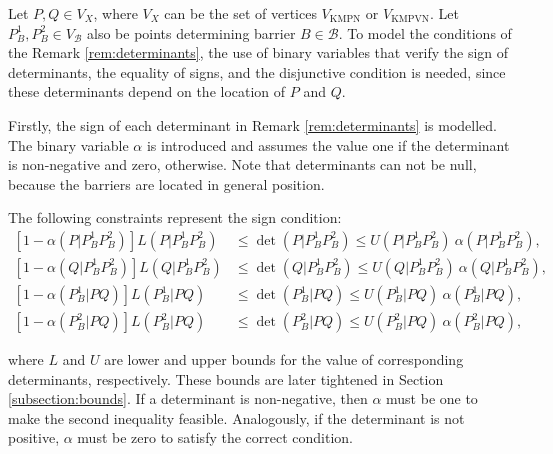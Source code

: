 \documentclass[a4paper,  review, authoryear, 1p.]{elsarticle}
\newcommand{\VB}{{V^{}_{\mathcal B}}}
\newcommand{\VKMPN}{{V_{\text{KMPN}}}}
\newcommand{\VKMPVN}{{V_{\text{KMPVN}}}}
\newcommand{\determinant}[3]{\det({#1|#2#3})}
\begin{document}
%	


Let $P,Q\in V_X$, where $V_X$ can be the set of vertices $\VKMPN$ or $\VKMPVN$. Let $P_B^1, P_B^2\in\VB$ also be points determining barrier $B\in\mathcal B$. To model the conditions of the Remark \ref{rem:determinants}, the use of binary variables that verify the sign of determinants, the equality of signs, and the disjunctive condition is needed, since these determinants depend on the location of $P$ and $Q$.

\newcommand{\LS}[3]{L(#1|#2#3)}
\newcommand{\US}[3]{U(#1|#2#3)}
\newcommand{\alphamas}[3]{\alpha(#1|#2#3)}
\newcommand{\alphamenos}[3]{\alpha^{-}(#1|#2#3)}
\newcommand{\alphapunto}[3]{\alpha^{\cdotp}(#1|#2#3)}

Firstly, the sign of each determinant in Remark \ref{rem:determinants} is modelled. The binary variable $\alpha$ is introduced and assumes the value one if the determinant is non-negative and zero, otherwise. Note that determinants can not be null, because the barriers are located in general position.

The following constraints represent the sign condition:
\begin{align*}\tag{$\alpha$-C}\label{eq:alphaC}
	\left[1-\alphamas{P}{P_B^1}{P_B^2}\right]\LS{P}{P_B^1}{P_B^2}&\leq\determinant{P}{P_B^1}{P_B^2}\leq \US{P}{P_B^1}{P_B^2}\:\alphamas{P}{P_B^1}{P_B^2},\\
	\left[1-\alphamas{Q}{P_B^1}{P_B^2}\right]\LS{Q}{P_B^1}{P_B^2}&\leq\determinant{Q}{P_B^1}{P_B^2}\leq \US{Q}{P_B^1}{P_B^2}\:\alphamas{Q}{P_B^1}{P_B^2},\\
	\left[1-\alphamas{P_B^1}{P}{Q}\right]\LS{P_B^1}{P}{Q}&\leq\determinant{P_B^1}{P}{Q}\leq \US{P_B^1}{P}{Q}\:\alphamas{P_B^1}{P}{Q},\\		\left[1-\alphamas{P_B^2}{P}{Q}\right]\LS{P_B^2}{P}{Q}&\leq\determinant{P_B^2}{P}{Q}\leq \US{P_B^2}{P}{Q}\:\alphamas{P_B^2}{P}{Q},
\end{align*}

\noindent where $L$ and $U$ are lower and upper bounds for the value of corresponding determinants, respectively. These bounds are later tightened in Section \ref{subsection:bounds}. If a determinant is non-negative, then $\alpha$ must be one to make the second inequality feasible. Analogously, if the determinant is not positive, $\alpha$ must be zero to satisfy the correct condition.

\newcommand{\betamas}[4]{\beta(#1#2|#3#4)}
\end{document}
